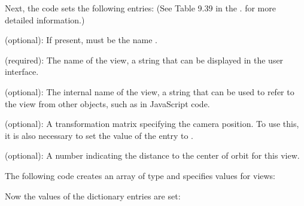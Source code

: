 \documentclass[letterpaper,12pt,english,openany,oneside]{sphinxmanual}
\begin{document}
Next, the code sets the following entries: (See Table 9.39 in the . for more detailed information.)

 (optional): If present, must be the name .

 (required): The name of the view, a string that can be displayed in the user interface.

 (optional): The internal name of the view, a string that can be used to refer to the view from other objects, such as in JavaScript code.

 (optional): A transformation matrix specifying the camera position. To use this, it is also necessary to set the value of the  entry to .

 (optional): A number indicating the distance to the center of orbit for this view.

The following code creates an array of type  and specifies values for views:

\begin{sphinxVerbatim}[commandchars=\\\{\}]
   
    

  \PYG{p}{[}\PYG{p}{]} 
          
          
     
\end{sphinxVerbatim}

Now the values of the dictionary entries are set:
\end{document}
